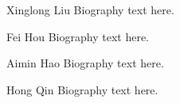 \documentclass[journal]{IEEEtran}
\begin{document}



%

\begin{IEEEbiography}{Xinglong Liu}
Biography text here.
\end{IEEEbiography}

\begin{IEEEbiographynophoto}{Fei Hou}
Biography text here.
\end{IEEEbiographynophoto}


\begin{IEEEbiographynophoto}{Aimin Hao}
Biography text here.
\end{IEEEbiographynophoto}

\begin{IEEEbiographynophoto}{Hong Qin}
Biography text here.
\end{IEEEbiographynophoto}






\end{document}
